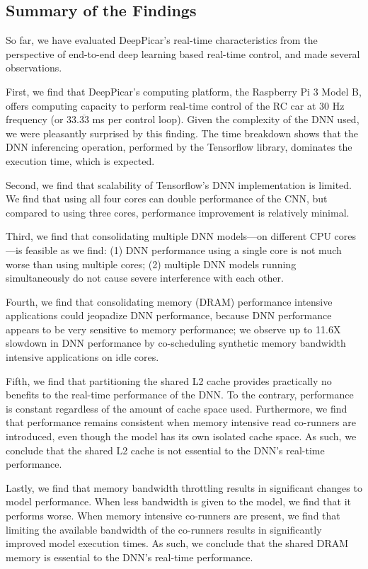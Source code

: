 



\subsection{Summary of the Findings}
So far, we have evaluated DeepPicar's real-time
characteristics from the perspective of end-to-end deep learning based
real-time control, and made several observations.

First, we find that DeepPicar's computing platform,
the Raspberry Pi 3 Model B, offers computing capacity to
perform real-time control of the RC car at 30 Hz frequency (or
33.$\overline{\mbox{33}}$ ms  per control loop). Given the complexity of 
the DNN used, we were pleasantly surprised by this finding. 
The time breakdown shows that the DNN inferencing operation, 
performed by the Tensorflow library, dominates the execution time, 
which is expected.

Second, we find that scalability of Tensorflow's DNN 
implementation is limited. We find that using all four cores can double 
performance of the CNN, but compared to using three cores, performance
improvement is relatively minimal.

Third, we find that consolidating multiple DNN models---on different CPU
cores---is feasible as we find: (1) DNN performance using a single
core is not much worse than using multiple cores; (2) multiple DNN
models running simultaneously do not cause severe interference with
each other.

Fourth, we find that consolidating memory (DRAM) performance
intensive applications could jeopadize DNN performance, because DNN
performance appears to be very sensitive to memory performance; we 
observe up to 11.6X slowdown in DNN performance by co-scheduling 
synthetic memory bandwidth intensive applications on idle cores.

Fifth, we find that partitioning the shared L2 cache provides 
practically no benefits to the real-time performance of the DNN. To the 
contrary, performance is constant regardless of the amount of cache 
space used. Furthermore, we find that performance remains consistent 
when memory intensive read co-runners are introduced, even though
the model has its own isolated cache space. As such, we 
conclude that the shared L2 cache is not essential to the DNN's real-time 
performance.

Lastly, we find that memory bandwidth throttling results in significant
changes to model performance. When less bandwidth is given to the model,
we find that it performs worse. When memory intensive co-runners are
present, we find that limiting the available bandwidth of the co-runners
results in significantly improved model execution times. As such, we conclude
that the shared DRAM memory is essential to the DNN's real-time 
performance.
